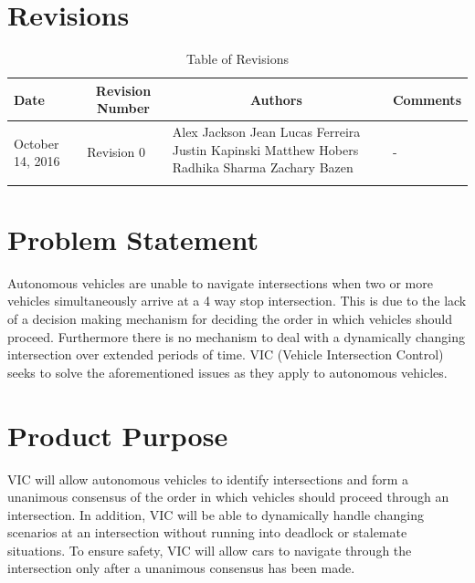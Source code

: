 \documentclass [12pt]{article}
\begin{document}

\tableofcontents
\listoftables

\pagebreak


\section{Revisions}
\begin{longtable}{| p{ } | p{ } | p{ } | p{ } |}

\hline 
\centering \textbf{Date} & 
\multicolumn{1}{c}{\textbf {Revision Number}} &
\multicolumn{1}{|c}{\textbf {Authors}} & 
\multicolumn{1}{|c|}{\textbf {Comments}} \\ \hline

\multirow{4}{*}{\centering October 14, 2016}  & 
\multirow{4}{*}{Revision 0}& 
{Alex Jackson \newline
		Jean Lucas Ferreira \newline
		Justin Kapinski\newline
		Matthew Hobers\newline
		Radhika Sharma\newline
		Zachary Bazen}
 &
\multirow{4}{*}{-} \\ 
\hline 

\caption{Table of Revisions} 
\end{longtable}



\pagebreak

\section{Problem Statement}
\indent\indent Autonomous vehicles are unable to navigate intersections when two or more vehicles simultaneously arrive at a 4 way stop intersection. This is due to the lack of a decision making mechanism for deciding the order in which vehicles should proceed.  Furthermore there is no mechanism to deal with a dynamically changing intersection over extended periods of time. VIC (Vehicle Intersection Control) seeks to solve the aforementioned issues as they apply to autonomous vehicles. 

\section{Product Purpose}
\indent\indent VIC will allow autonomous vehicles to identify intersections and form a unanimous consensus of the order in which vehicles should proceed through an intersection. In addition, VIC will be able to dynamically handle changing scenarios at an intersection without running into deadlock or stalemate situations. To ensure safety, VIC will allow cars to navigate through the intersection only after a unanimous consensus has been made.
\end{document}
